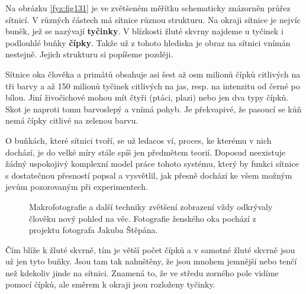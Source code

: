     Na obrázku \ref{fyz:fig131} je ve zvětšeném měřítku schematicky znázorněn průřez sítnicí. V
    různých částech má sítnice různou strukturu. Na okraji sítnice je nejvíc buněk, jež se nazývají
    \textbf{tyčinky}. V blízkosti žluté skvrny najdeme u tyčinek i podlouhlé buňky \textbf{čípky}.
    Takže už z tohoto hlediska je obraz na sítnici vnímán nestejně. Jejich strukturu si popíšeme
    později. 
    
    
    Sítnice oka člověka a primátů obsahuje asi šest až osm milionů čípků citlivých na tři barvy a až
    150 milionů tyčinek citlivých na jas, resp. na intenzitu od černé po bílou. Jiní živočichové
    mohou mít čtyři (ptáci, plazi) nebo jen dva typy čípků. Skot je naproti tomu barvoslepý a vnímá
    pohyb. Je překvapivé, že pasoucí se kůň nemá čípky citlivé na zelenou barvu.

    O buňkách, které sítnici tvoří, se už ledacos ví, proces, ke kterému v nich dochází, je do velké
    míry stále spíš jen předmětem teorií. Doposud neexistuje žádný uspokojivý komplexní model práce
    tohoto systému, který by funkci sítnice s dostatečnou přesností popsal a vysvětlil, jak přesně
    dochází ke všem možným jevům pozorovaným při experimentech.
    
    \begin{figure*}[ht!] %
      \centering
      \caption{Makrofotografie a další techniky zvětšení zobrazení vždy odkrývaly člověku nový
              pohled na věc. Fotografie ženského oka pochází z projektu \HumanEye fotografa Jakuba
              Štěpána.}
      \label{fyz:fig920}
    \end{figure*}

    Čím blíže k žluté skvrně, tím je větší počet čípků a v samotné žluté skvrně jsou už jen tyto
    buňky. Jsou tam tak nahuštěny, že jsou mnohem jemnější nebo tenčí než kdekoliv jinde na sítnici.
    Znamená to, že ve středu zorného pole vidíme pomocí čípků, ale směrem k okraji jsou rozloženy
    tyčinky. 
    
